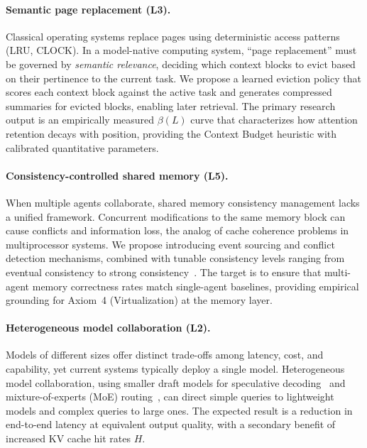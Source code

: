 \paragraph{Semantic page replacement (L3).}
Classical operating systems replace pages using deterministic access patterns (LRU, CLOCK). In a model-native computing system, ``page replacement'' must be governed by \textit{semantic relevance}, deciding which context blocks to evict based on their pertinence to the current task.
We propose a learned eviction policy that scores each context block against the active task and generates compressed summaries for evicted blocks, enabling later retrieval.
The primary research output is an empirically measured $\beta(L)$ curve that characterizes how attention retention decays with position, providing the Context Budget heuristic with calibrated quantitative parameters.

\paragraph{Consistency-controlled shared memory (L5).}
When multiple agents collaborate, shared memory consistency management lacks a unified framework.
Concurrent modifications to the same memory block can cause conflicts and information loss, the analog of cache coherence problems in multiprocessor systems.
We propose introducing event sourcing and conflict detection mechanisms, combined with tunable consistency levels ranging from eventual consistency to strong consistency~\cite{raft2014,cap2002}.
The target is to ensure that multi-agent memory correctness rates match single-agent baselines, providing empirical grounding for Axiom~4 (Virtualization) at the memory layer.

\paragraph{Heterogeneous model collaboration (L2).}
Models of different sizes offer distinct trade-offs among latency, cost, and capability, yet current systems typically deploy a single model.
Heterogeneous model collaboration, using smaller draft models for speculative decoding~\cite{leviathan2023speculative} and mixture-of-experts (MoE) routing~\cite{switch2022,mixtral2024}, can direct simple queries to lightweight models and complex queries to large ones.
The expected result is a reduction in end-to-end latency at equivalent output quality, with a secondary benefit of increased KV cache hit rates $H$.

